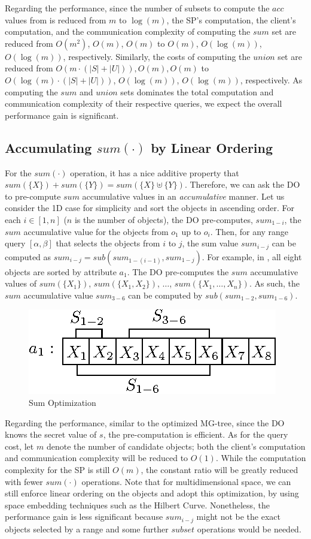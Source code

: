 Regarding the performance, since the number of subsets to compute the $acc$ values from is reduced from $m$ to $\log(m)$, the SP's computation, the client's computation, and the communication complexity of computing the $sum$ set are reduced from $O(m^2)$, $O(m)$, $O(m)$ to $O(m)$, $O(\log(m))$, $O(\log(m))$, respectively. Similarly, the costs of computing the $union$ set are reduced from $O(m \cdot (|S|+ |U|)), O(m), O(m)$ to $O(\log(m) \cdot (|S| + |U|))$, $O(\log(m))$, $O(\log(m))$, respectively. As computing the $sum$ and $union$ sets dominates the total computation and communication complexity of their respective queries, we expect the overall performance gain is  significant.

\subsection{Accumulating $sum(\cdot)$ by Linear Ordering}
For the $sum(\cdot)$ operation, it has a nice additive property that $sum(\{X\}) + sum(\{Y\}) = sum(\{X\} \uplus \{Y\})$. Therefore, we can ask the DO to pre-compute $sum$ accumulative values in an \emph{accumulative} manner. Let us consider the 1D case for simplicity and sort the objects in ascending order. For each $i \in [1, n]$ ($n$ is the number of objects), the DO pre-computes, $sum_{1-i}$, the $sum$ accumulative value for the objects from $o_1$ up to $o_i$. Then, for any range query $[\alpha, \beta]$ that selects the objects from $i$ to $j$, the sum value $sum_{i-j}$ can be computed as $sum_{i-j} = sub(sum_{1-(i-1)}, sum_{1-j})$. For example, in , all eight objects are sorted by attribute $a_1$. The DO pre-computes the $sum$ accumulative values of $sum(\{X_1\})$, $sum(\{X_1, X_2\})$, $\dots$, $sum(\{X_1, \dots, X_n\})$. As such, the $sum$ accumulative value $sum_{3-6}$ can be computed by $sub(sum_{1-2}, sum_{1- 6})$.

\begin{figure}
  \centering
  \includegraphics[width=0.5\linewidth]{figs/aggregate-queries/sum_opt.eps}
  \caption{Sum Optimization}\label{fig:aggregate-queries:sum_opt}
\end{figure}

Regarding the performance, similar to the optimized MG-tree, since the DO knows the secret value of $s$, the pre-computation is efficient. As for the query cost, let $m$ denote the number of candidate objects; both the client's computation and communication complexity will be reduced to $O(1)$. While the computation complexity for the SP is still $O(m)$, the constant ratio will be greatly reduced with fewer $sum(\cdot)$ operations. Note that for multidimensional space, we can still enforce linear ordering on the objects and adopt this optimization, by using space embedding techniques such as the Hilbert Curve. Nonetheless, the performance gain is less significant because $sum_{i-j}$ might not be the exact objects selected by a range and some further $subset$ operations would be needed.

